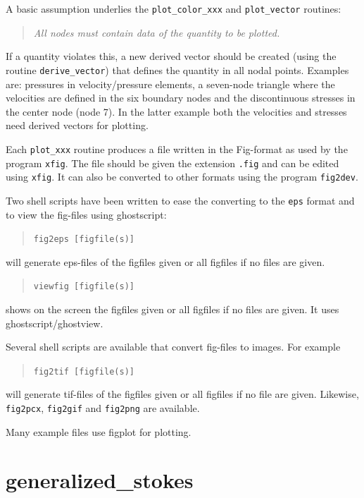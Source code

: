 A basic assumption underlies the \texttt{plot\_color\_xxx} and
\texttt{plot\_vector} routines:
\begin{quote}
   \emph{All nodes must contain data of the quantity to be plotted.}
\end{quote}
If a quantity violates this, a new derived vector should be created (using the
routine \texttt{derive\_vector}) that defines the quantity in all nodal points.
Examples are: pressures in velocity/pressure elements, a seven-node triangle
where the velocities are defined in the six boundary nodes and
the discontinuous stresses in the center node (node 7). In the latter example
both the velocities and stresses need derived vectors for plotting.

Each \texttt{plot\_xxx} routine produces a file written in the Fig-format as
used by the program \texttt{xfig}. The file should be given the extension
\texttt{.fig} and can be edited using \texttt{xfig}.
It can also be converted to other formats using the program \texttt{fig2dev}.

Two shell scripts have been written to ease the converting to the \texttt{eps}
format and to view the fig-files using ghostscript:
\begin{quote}
   \texttt{fig2eps [figfile(s)]}
\end{quote}
will generate eps-files of the figfiles given or all figfiles if no files are
given.
\begin{quote}
   \texttt{viewfig [figfile(s)]}
\end{quote}
shows on the screen the figfiles given or all figfiles if no files are
given. It uses ghostscript/ghostview.

Several shell scripts are available that convert fig-files to images.
For example
\begin{quote}
   \texttt{fig2tif [figfile(s)]}
\end{quote}
will generate tif-files of the figfiles given or all figfiles if no file are
given. Likewise, \texttt{fig2pcx}, \texttt{fig2gif} and \texttt{fig2png} are
available.

Many example files use figplot for plotting.

\section{generalized\_stokes}
\label{sec:generalized_stokes}

